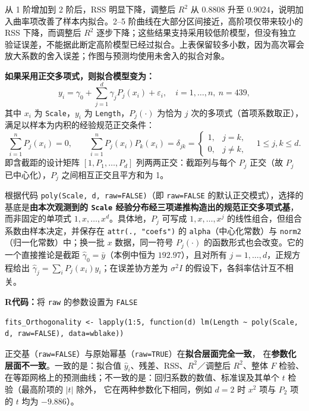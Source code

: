 \documentclass[12pt,a4paper]{article}
\begin{document}
\begin{answerbox}
从 1 阶增加到 2 阶后，RSS 明显下降，调整后 $R^2$ 从 $0.8808$ 升至 $0.9024$，说明加入曲率项改善了样本内拟合。2--5 阶曲线在大部分区间接近，高阶项仅带来较小的 RSS 下降，而调整后 $R^2$ 逐步下降；这些结果支持采用较低阶模型，但没有独立验证误差，不能据此断定高阶模型已经过拟合。上表保留较多小数，因为高次幂会放大系数的舍入误差；作图与预测均使用未舍入的拟合对象。

\textbf{如果采用正交多项式，则拟合模型变为：}
$$
y_i=\gamma_0+\sum_{j=1}^{d}\gamma_j P_j(x_i)+\varepsilon_i,
\quad i=1,\dots,n,\ n=439,
$$
其中 $x_i$ 为 \texttt{Scale}，$y_i$ 为 \texttt{Length}，$P_j(\cdot)$ 为恰为 $j$ 次的多项式（首项系数取正），满足以样本为内积的经验规范正交条件：
$$
\sum_{i=1}^{n}P_j(x_i)=0,\qquad
\sum_{i=1}^{n}P_j(x_i)P_k(x_i)=\delta_{jk}
=\begin{cases}1,&j=k,\\ 0,&j\ne k,\end{cases}
\quad 1\le j,k\le d.
$$
即含截距的设计矩阵 $[1,P_1,\dots,P_d]$ 列两两正交：截距列与每个 $P_j$ 正交（故 $P_j$ 已中心化），$P_j$ 之间相互正交且平方和为 1。

根据代码 \texttt{poly(Scale, d, raw=FALSE)}（即 \texttt{raw=FALSE} 的默认正交模式），选择的基底是\textbf{由本次观测到的 \texttt{Scale} 经验分布经三项递推构造出的规范正交多项式基}，而非固定的单项式 $1,x,\dots,x^d$。具体地，$P_j$ 可写成 $1,x,\dots,x^j$ 的线性组合，但组合系数由样本决定，并保存在 \texttt{attr(., "coefs")} 的 \texttt{alpha}（中心化常数）与 \texttt{norm2}（归一化常数）中；换一批 $x$ 数据，同一符号 $P_j(\cdot)$ 的函数形式也会改变。它的一个直接推论是截距 $\hat{\gamma}_0=\bar{y}$（本例中恒为 $192.97$），且对所有 $j=1,\ldots,d$，正规方程给出 $\hat{\gamma}_j=\sum_i P_j(x_i)y_i$；在误差协方差为 $\sigma^2I$ 的假设下，各斜率估计互不相关。

\textbf{R代码：}将 \texttt{raw} 的参数设置为 \texttt{FALSE}
\begin{lstlisting}[style=rcode]
fits_Orthogonality <- lapply(1:5, function(d) lm(Length ~ poly(Scale, d, raw=FALSE), data=wblake))                                                                                 
\end{lstlisting}

正交基（\texttt{raw=FALSE}）与原始幂基（\texttt{raw=TRUE}）在\textbf{拟合层面完全一致}，
在\textbf{参数化层面不一致}。一致的是：拟合值 $\hat{y}_i$、残差、RSS、$R^2$／调整后 $R^2$、整体 $F$ 检验、
在等距网格上的预测曲线；不一致的是：回归系数的数值、标准误及其单个 $t$ 检验（最高阶项的 $\lvert t\rvert$ 除外，
它在两种参数化下相同，例如 $d=2$ 时 $x^2$ 项与 $P_2$ 项的 $t$ 均为 $-9.886$）。


\end{answerbox}
\end{document}
